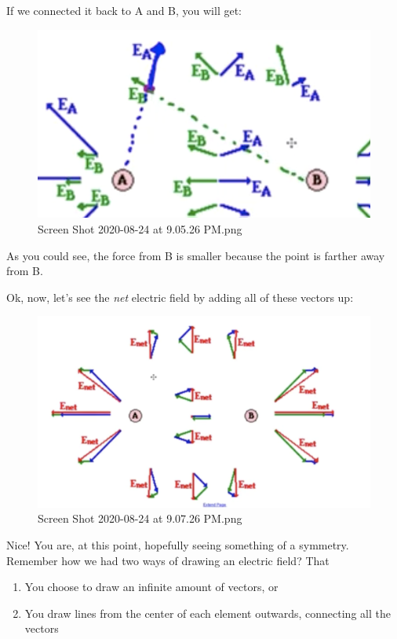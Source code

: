 \documentclass[letterpaper]{article}
\begin{document}
If we connected it back to A and B, you will get:

\begin{figure}[htbp]
\centering
\includegraphics[width=.9\linewidth]{./Screen Shot 2020-08-24 at 9.05.26 PM.png}
\caption{Screen Shot 2020-08-24 at 9.05.26 PM.png}
\end{figure}

As you could see, the force from B is smaller because the point is
farther away from B.

Ok, now, let's see the \emph{net} electric field by adding all of these
vectors up:

\begin{figure}[htbp]
\centering
\includegraphics[width=.9\linewidth]{./Screen Shot 2020-08-24 at 9.07.26 PM.png}
\caption{Screen Shot 2020-08-24 at 9.07.26 PM.png}
\end{figure}

Nice! You are, at this point, hopefully seeing something of a symmetry.
Remember how we had two ways of drawing an electric field? That

\begin{enumerate}
\item You choose to draw an infinite amount of vectors, or
\item You draw lines from the center of each element outwards, connecting
all the vectors
\end{enumerate}
\end{document}
